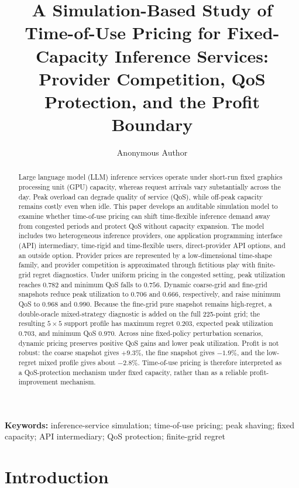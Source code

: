 \documentclass[11pt,a4paper]{article}
\title{\textbf{A Simulation-Based Study of Time-of-Use Pricing for Fixed-Capacity Inference Services:\\
Provider Competition, QoS Protection, and the Profit Boundary}}
\author{Anonymous Author}
\date{}
\begin{document}
\maketitle

\begin{abstract}
Large language model (LLM) inference services operate under short-run fixed graphics processing unit (GPU) capacity, whereas request arrivals vary substantially across the day. Peak overload can degrade quality of service (QoS), while off-peak capacity remains costly even when idle. This paper develops an auditable simulation model to examine whether time-of-use pricing can shift time-flexible inference demand away from congested periods and protect QoS without capacity expansion. The model includes two heterogeneous inference providers, one application programming interface (API) intermediary, time-rigid and time-flexible users, direct-provider API options, and an outside option. Provider prices are represented by a low-dimensional time-shape family, and provider competition is approximated through fictitious play with finite-grid regret diagnostics. Under uniform pricing in the congested setting, peak utilization reaches $0.782$ and minimum QoS falls to $0.756$. Dynamic coarse-grid and fine-grid snapshots reduce peak utilization to $0.706$ and $0.666$, respectively, and raise minimum QoS to $0.968$ and $0.990$. Because the fine-grid pure snapshot remains high-regret, a double-oracle mixed-strategy diagnostic is added on the full 225-point grid; the resulting $5\times5$ support profile has maximum regret $0.203$, expected peak utilization $0.703$, and minimum QoS $0.970$. Across nine fixed-policy perturbation scenarios, dynamic pricing preserves positive QoS gains and lower peak utilization. Profit is not robust: the coarse snapshot gives $+9.3\%$, the fine snapshot gives $-1.9\%$, and the low-regret mixed profile gives about $-2.8\%$. Time-of-use pricing is therefore interpreted as a QoS-protection mechanism under fixed capacity, rather than as a reliable profit-improvement mechanism.
\end{abstract}

\noindent\textbf{Keywords:} inference-service simulation; time-of-use pricing; peak shaving; fixed capacity; API intermediary; QoS protection; finite-grid regret

\section{Introduction}
\label{sec:intro}
\end{document}
